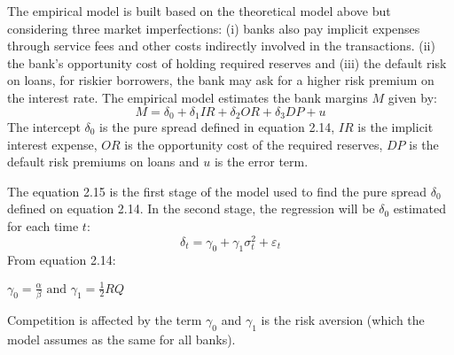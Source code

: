 The empirical model is built based on the theoretical model above but considering three market imperfections: (i) banks also pay implicit expenses through service fees and other costs indirectly involved in the transactions. (ii) the bank's opportunity cost of holding required reserves and (iii) the default risk on loans, for riskier borrowers, the bank may ask for a higher risk premium on the interest rate. The empirical model estimates the bank margins $M$ given by:
\begin{equation}
  M = \delta_0 + \delta_1  IR + \delta_2 OR + \delta_3 DP + u
\end{equation}
The intercept $\delta_0$ is the pure spread defined in equation 2.14, $IR$ is the implicit interest expense, $OR$ is the opportunity cost of the required reserves, $DP$ is the default risk premiums on loans and $u$ is the error term.

The equation 2.15 is the first stage of the model used to find the pure spread $\delta_0$ defined on equation 2.14. In the second stage, the regression will be $\delta_0$ estimated for each time $t$:
\begin{equation}
  \delta_t = \gamma_0 +\gamma_1 \sigma_t^2 +\varepsilon_t
\end{equation}
From equation 2.14: 
\begin{center}
  $\gamma_0 = \frac{\alpha}{\beta} \text{ and } \gamma_1 = \frac{1}{2}RQ$
\end{center}

Competition is affected by the term $\gamma_0$ and $\gamma_1$ is the risk aversion (which the model assumes as the same for all banks).